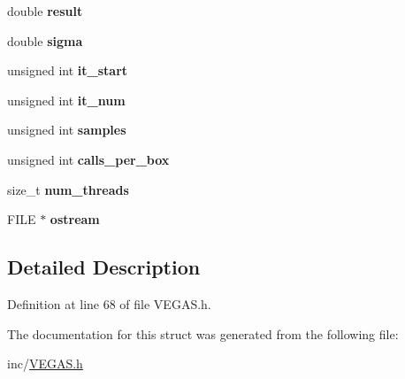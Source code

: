 \begin{DoxyCompactItemize}
\item 
\hypertarget{structMYVEGAS_1_1gsl__monte__vegas__state_a53cf2612f6c29a9807ffc93f931a21ee}{double {\bfseries result}}\label{structMYVEGAS_1_1gsl__monte__vegas__state_a53cf2612f6c29a9807ffc93f931a21ee}

\item 
\hypertarget{structMYVEGAS_1_1gsl__monte__vegas__state_a02c2be5f072c97e35560c6e06590ce3d}{double {\bfseries sigma}}\label{structMYVEGAS_1_1gsl__monte__vegas__state_a02c2be5f072c97e35560c6e06590ce3d}

\item 
\hypertarget{structMYVEGAS_1_1gsl__monte__vegas__state_a1f32d520eb39e45a7240fed6f8cfb3f4}{unsigned int {\bfseries it\-\_\-start}}\label{structMYVEGAS_1_1gsl__monte__vegas__state_a1f32d520eb39e45a7240fed6f8cfb3f4}

\item 
\hypertarget{structMYVEGAS_1_1gsl__monte__vegas__state_a1457495fc811973fbb1ddce11e6dfbff}{unsigned int {\bfseries it\-\_\-num}}\label{structMYVEGAS_1_1gsl__monte__vegas__state_a1457495fc811973fbb1ddce11e6dfbff}

\item 
\hypertarget{structMYVEGAS_1_1gsl__monte__vegas__state_a00ebe227b265d6ef3090234865af6674}{unsigned int {\bfseries samples}}\label{structMYVEGAS_1_1gsl__monte__vegas__state_a00ebe227b265d6ef3090234865af6674}

\item 
\hypertarget{structMYVEGAS_1_1gsl__monte__vegas__state_a9c3829e2fa008d59866fe2a59e83f7c8}{unsigned int {\bfseries calls\-\_\-per\-\_\-box}}\label{structMYVEGAS_1_1gsl__monte__vegas__state_a9c3829e2fa008d59866fe2a59e83f7c8}

\item 
\hypertarget{structMYVEGAS_1_1gsl__monte__vegas__state_a960b4dbe06158a581a9923cc40521d07}{size\-\_\-t {\bfseries num\-\_\-threads}}\label{structMYVEGAS_1_1gsl__monte__vegas__state_a960b4dbe06158a581a9923cc40521d07}

\item 
\hypertarget{structMYVEGAS_1_1gsl__monte__vegas__state_ac3151d55c71b87b4a70b0d394b48b151}{F\-I\-L\-E $\ast$ {\bfseries ostream}}\label{structMYVEGAS_1_1gsl__monte__vegas__state_ac3151d55c71b87b4a70b0d394b48b151}

\end{DoxyCompactItemize}


\subsection{Detailed Description}


Definition at line 68 of file V\-E\-G\-A\-S.\-h.



The documentation for this struct was generated from the following file\-:\begin{DoxyCompactItemize}
\item 
inc/\hyperlink{VEGAS_8h}{V\-E\-G\-A\-S.\-h}\end{DoxyCompactItemize}
